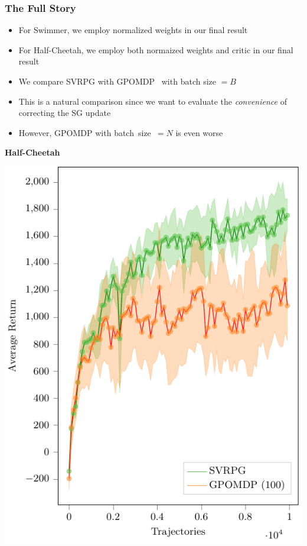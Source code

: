 \documentclass[aspectratio=169]{beamer}
\begin{document}
\begin{frame} 
\frametitle{The Full Story} 

\begin{minipage}[]{.45\paperwidth}
	\begin{itemize}
		\item For Swimmer, we employ normalized weights in our final result
		\item For Half-Cheetah, we employ both normaized weights and critic in our final result
		\item We compare SVRPG with GPOMDP~\citep{baxter2001infinite} with batch size $=B$
		\item This is a natural comparison since we want to evaluate the \textit{convenience} of 	correcting the SG update
		\item However, GPOMDP with batch~size~$=N$ is even worse
	\end{itemize}
\end{minipage}
\hfill%
\begin{minipage}[]{.35\paperwidth}
	\begin{center}
	\textbf{Half-Cheetah}
\end{center}
\includegraphics[width=.9\textwidth]{images/cheetah100.pdf}
\end{minipage}

\end{frame}
\end{document}
